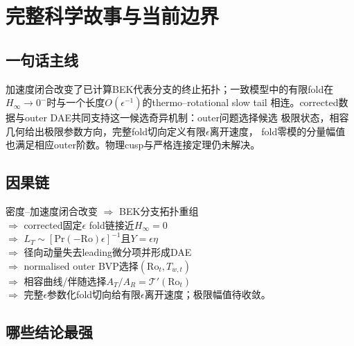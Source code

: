 \documentclass[UTF8,zihao=-4,openany]{ctexbook}
\newcommand{\eps}{\epsilon}
\newcommand{\Ro}{\mathrm{Ro}}
\newcommand{\Pran}{\mathrm{Pr}}
\newcommand{\Tcurve}{\mathcal T}
\begin{document}
\chapter{完整科学故事与当前边界}\label{ch:story}

\section{一句话主线}

\begin{keyresult}
加速度闭合改变了已计算BEK代表分支的终止拓扑；一致模型中的有限fold在
$H_\infty\to0^-$时与一个长度$O(\eps^{-1})$的thermo--rotational slow tail
相连。corrected数据与outer DAE共同支持这一候选奇异机制：outer问题选择候选
极限状态，相容几何给出极限参数方向，完整fold切向定义有限$\eps$离开速度，
fold零模的分量幅值也满足相应outer阶数。物理cusp与严格连接定理仍未解决。
\end{keyresult}

\section{因果链}

\begin{center}
\begin{minipage}{0.90\textwidth}
\centering
密度--加速度闭合改变
$\Longrightarrow$ BEK分支拓扑重组\\[0.35em]
$\Longrightarrow$ corrected固定$\eps$ fold链接近$H_\infty=0$\\[0.35em]
$\Longrightarrow$ $L_T\sim[\Pran(-\Ro)\eps]^{-1}$且$Y=\eps\eta$\\[0.35em]
$\Longrightarrow$ 径向动量失去leading微分项并形成DAE\\[0.35em]
$\Longrightarrow$ normalised outer BVP选择$(\Ro_t,T_{w,t})$\\[0.35em]
$\Longrightarrow$ 相容曲线/伴随选择$A_T/A_R=\Tcurve'(\Ro_t)$\\[0.35em]
$\Longrightarrow$ 完整$\eps$参数化fold切向给有限$\eps$离开速度；极限幅值待收敛。
\end{minipage}
\end{center}

\section{哪些结论最强}
\end{document}
